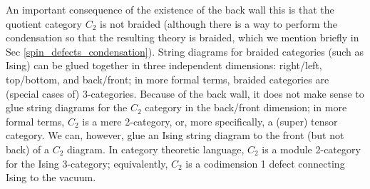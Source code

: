 \documentclass[12pt,a4paper]{article}
\newcounter{arrow}
\newcommand{\ra}{\rightarrow}
\newcommand{\mcz}{\mathcal{Z}}
\newcommand{\mcc}{\mathcal{C}}
\begin{document}
An important consequence of the existence of the back wall this is that the quotient category $C_2$ is not braided (although there is a way to perform the condensation so that the resulting theory is braided, which we mention briefly in Sec \ref{spin_defects_condensation}).
String diagrams for braided categories (such as Ising) can be glued together in three independent dimensions: right/left, top/bottom, and back/front; in more formal terms, braided categories are (special cases of) 3-categories.
Because of the back wall, it does not make sense to glue string diagrams for the $C_2$ category in the back/front
dimension; in more formal terms, $C_2$ is a mere 2-category, or, more specifically, a (super) tensor category.
We can, however, glue an Ising string diagram to the front (but not back) of a $C_2$ diagram.
In category theoretic language, $C_2$ is a module 2-category for the Ising 3-category; equivalently, $C_2$ is a codimension 1 defect
connecting Ising to the vacuum.


\medskip
\end{document}
